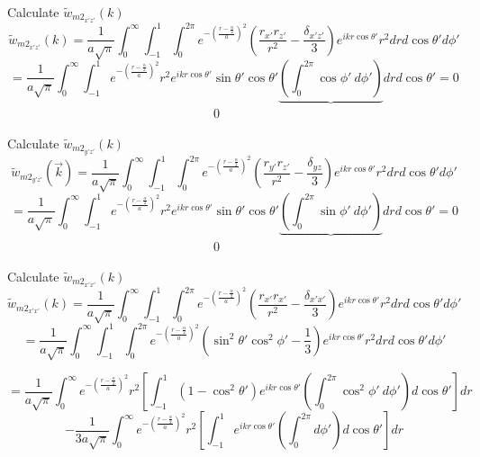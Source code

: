 \documentclass[double,12pt]{beavtex}
\begin{document}
Calculate $\widetilde{w}_{{m2}_{x'z'}}(k)$ 
\begin{equation}{\widetilde{w}_{{m2}_{x'z'}}(k)=\frac{1}{a\sqrt{\pi}}\int_{0}^{\infty}\int_{-1}^{1}\int_{0}^{2\pi}e^{-\left(\frac{r-\frac{\alpha}{2}}{a}\right)^2}\left(\frac{r_{x'}r_{z'}}{r^2}-\frac{\delta_{x'z'}}{3}\right)e^{ikr\cos\theta'}r^2d{r}d{\cos\theta'}d{\phi'}}\end{equation}
\begin{equation}{=\frac{1}{a\sqrt{\pi}}\int_{0}^{\infty}\int_{-1}^{1}e^{-\left(\frac{r-\frac{\alpha}{2}}{a}\right)^2}r^2e^{ikr\cos\theta'}\sin\theta'\cos\theta'\underbrace{\left(\int_{0}^{2\pi}\cos\phi'~d{\phi'}\right)}d{r}d{\cos\theta'}=0}\end{equation}
$~~~~~~~~~~~~~~~~~~~~~~~~~~~~~~~~~~~~~~~~~~~~~~~~~~~~~~~~~~~~~~~~~~~~~~~~~~0$

Calculate $\widetilde{w}_{{m2}_{y'z'}}(k)$ 
\begin{equation}{\widetilde{w}_{{m2}_{y'z'}}(\vec{k})=\frac{1}{a\sqrt{\pi}}\int_{0}^{\infty}\int_{-1}^{1}\int_{0}^{2\pi}e^{-\left(\frac{r-\frac{\alpha}{2}}{a}\right)^2}\left(\frac{r_{y'}r_{z'}}{r^2}-\frac{\delta_{yz}}{3}\right)e^{ikr\cos\theta'}r^2d{r}d{\cos\theta'}d{\phi'}}\end{equation}
\begin{equation}{=\frac{1}{a\sqrt{\pi}}\int_{0}^{\infty}\int_{-1}^{1}e^{-\left(\frac{r-\frac{\alpha}{2}}{a}\right)^2}r^2e^{ikr\cos\theta'}\sin\theta'\cos\theta'\underbrace{\left(\int_{0}^{2\pi}\sin\phi'~d{\phi'}\right)}d{r}d{\cos\theta'}=0}\end{equation}
$~~~~~~~~~~~~~~~~~~~~~~~~~~~~~~~~~~~~~~~~~~~~~~~~~~~~~~~~~~~~~~~~~~~~~~~~~~0$

Calculate $\widetilde{w}_{{m2}_{x'x'}}(k)$ 
\begin{equation}{\widetilde{w}_{{m2}_{x'x'}}(k)=\frac{1}{a\sqrt{\pi}}\int_{0}^{\infty}\int_{-1}^{1}\int_{0}^{2\pi}e^{-\left(\frac{r-\frac{\alpha}{2}}{a}\right)^2}\left(\frac{r_{x'}r_{x'}}{r^2}-\frac{\delta_{x'x'}}{3}\right)e^{ikr\cos\theta'}r^2d{r}d{\cos\theta'}d{\phi'}}\end{equation}
\begin{equation}{=\frac{1}{a\sqrt{\pi}}\int_{0}^{\infty}\int_{-1}^{1}\int_{0}^{2\pi}e^{-\left(\frac{r-\frac{\alpha}{2}}{a}\right)^2}\left(\sin^2\theta'\cos^2\phi'-\frac{1}{3}\right)e^{ikr\cos\theta'}r^2d{r}d{\cos\theta'}d{\phi'}}\end{equation}

\begin{displaymath}{=\frac{1}{a\sqrt{\pi}}\int_{0}^{\infty}e^{-\left(\frac{r-\frac{\alpha}{2}}{a}\right)^2}r^2\left[\int_{-1}^{1}\left(1-\cos^2\theta'\right)e^{ikr\cos\theta'}\left(\int_{0}^{2\pi}\cos^2\phi'~d{\phi'}\right)d{\cos\theta'}\right]d{r}}\end{displaymath} 
\begin{equation}{-\frac{1}{3a\sqrt{\pi}}\int_{0}^{\infty}e^{-\left(\frac{r-\frac{\alpha}{2}}{a}\right)^2}r^2\left[\int_{-1}^{1}e^{ikr\cos\theta'}\left(\int_{0}^{2\pi}d{\phi'}\right)d{\cos\theta'}\right]d{r}}\end{equation}
\end{document}
